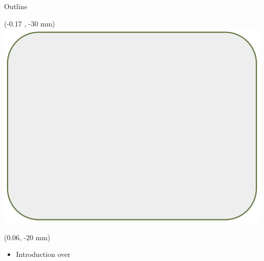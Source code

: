 \documentclass[usenames,dvipsnames, xcolor=table, 9pt]{beamer}
\begin{document}
\begin{frame}{Outline}
	
	
\begin{textblock*}{\paperwidth}(-0.17 \paperwidth, -30 mm)%
	\hfill \includegraphics [width=0.81\linewidth ]{pics/bg_33}%
	
\end{textblock*}	


\begin{textblock*}{0.86\paperwidth}(0.06\paperwidth, -20 mm)%
	
	
	\begin{itemize}
	
		
		\item Introduction over
		\vspace{0.3 cm}
	
	
			
		\end{itemize}
	
	
\end{textblock*}
	
\end{frame}
\end{document}

